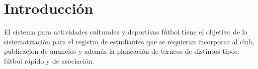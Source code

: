 \section{Introducción}

\begin{description}
	\item El sistema para actividades culturales y deportivas fútbol tiene el objetivo de la sistematización para el registro de estudiantes que se requieran incorporar al club, publicación de anuncios y además la planeación de torneos de distintos tipos: fútbol rápido y de asociación.
\end{description}

